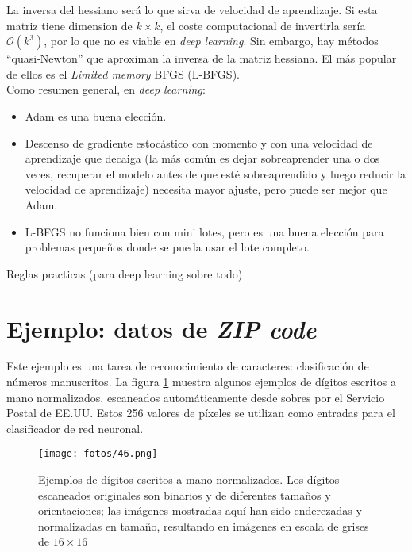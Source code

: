La inversa del hessiano será lo que sirva de velocidad de aprendizaje. Si esta matriz tiene dimension de $k \times k$, el coste computacional de invertirla sería $\mathcal{O}(k^3)$, por lo que no es viable en \textit{deep learning}. Sin embargo, hay métodos ``quasi-Newton'' que aproximan la inversa de la matriz hessiana. El más popular de ellos es el \textit{Limited memory} BFGS (L-BFGS). \\

\noindent Como resumen general, en \textit{deep learning}:
\begin{itemize}
\item Adam es una buena elección.
\item Descenso de gradiente estocástico con momento y con una velocidad de aprendizaje que decaiga (la más común es dejar sobreaprender una o dos veces, recuperar el modelo antes de que esté sobreaprendido y luego reducir la velocidad de aprendizaje) necesita mayor ajuste, pero puede ser mejor que Adam.
\item L-BFGS no funciona bien con mini lotes, pero es una buena elección para problemas pequeños donde se pueda usar el lote completo.
\end{itemize}



Reglas practicas (para deep learning sobre todo)


\section{Ejemplo: datos de \textit{ZIP code}}

Este ejemplo es una tarea de reconocimiento de caracteres: clasificación de números manuscritos. La figura \ref{fig:7.7} muestra algunos ejemplos de dígitos escritos a mano normalizados, escaneados automáticamente desde sobres por el Servicio Postal de EE.UU. Estos 256 valores de píxeles se utilizan como entradas para el clasificador de red neuronal. \\

\begin{figure}[h]
\centering
\texttt{[image: fotos/46.png]}
\caption{Ejemplos de dígitos escritos a mano normalizados. Los dígitos escaneados originales son binarios y de diferentes tamaños y orientaciones; las imágenes mostradas aquí han sido enderezadas y normalizadas en tamaño, resultando en imágenes en escala de grises de $16 \times 16$}
\label{fig:7.7}
\end{figure}

